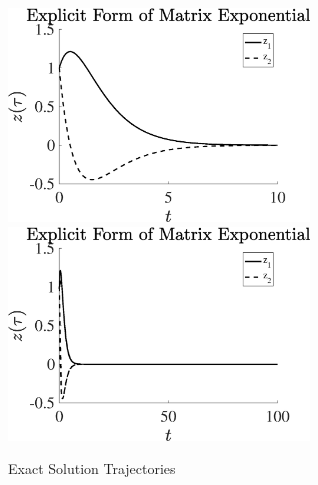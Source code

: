 \documentclass[11pt]{article}
\begin{document}
 \begin{figure}[h]
 \centering
\includegraphics[width=8cm]{explicit_form_soln.eps}
\includegraphics[width=8cm]{explicit_form_soln_lt.eps}
\caption{Exact Solution Trajectories}
\label{exact}
\end{figure}
\clearpage 
\end{document}
